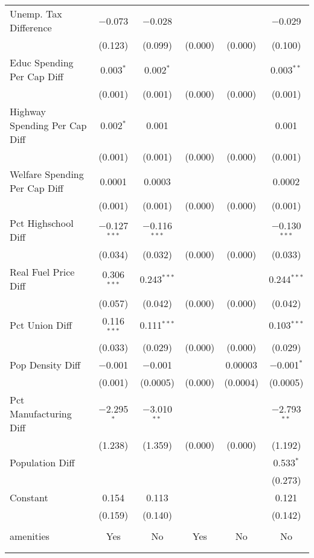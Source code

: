 \begin{table}[!htbp]
\begin{tabular}{@{\extracolsep{5pt}}lccccc}
  Unemp. Tax Difference & $-$0.073 & $-$0.028 &  &  & $-$0.029 \\ 
  & (0.123) & (0.099) & (0.000) & (0.000) & (0.100) \\ 
  Educ Spending Per Cap Diff & 0.003$^{*}$ & 0.002$^{*}$ &  &  & 0.003$^{**}$ \\ 
  & (0.001) & (0.001) & (0.000) & (0.000) & (0.001) \\ 
  Highway Spending Per Cap Diff & 0.002$^{*}$ & 0.001 &  &  & 0.001 \\ 
  & (0.001) & (0.001) & (0.000) & (0.000) & (0.001) \\ 
  Welfare Spending Per Cap Diff & 0.0001 & 0.0003 &  &  & 0.0002 \\ 
  & (0.001) & (0.001) & (0.000) & (0.000) & (0.001) \\ 
  Pct Highschool Diff & $-$0.127$^{***}$ & $-$0.116$^{***}$ &  &  & $-$0.130$^{***}$ \\ 
  & (0.034) & (0.032) & (0.000) & (0.000) & (0.033) \\ 
  Real Fuel Price Diff & 0.306$^{***}$ & 0.243$^{***}$ &  &  & 0.244$^{***}$ \\ 
  & (0.057) & (0.042) & (0.000) & (0.000) & (0.042) \\ 
  Pct Union Diff & 0.116$^{***}$ & 0.111$^{***}$ &  &  & 0.103$^{***}$ \\ 
  & (0.033) & (0.029) & (0.000) & (0.000) & (0.029) \\ 
  Pop Density Diff & $-$0.001 & $-$0.001 &  & 0.00003 & $-$0.001$^{*}$ \\ 
  & (0.001) & (0.0005) & (0.000) & (0.0004) & (0.0005) \\ 
  Pct Manufacturing Diff & $-$2.295$^{*}$ & $-$3.010$^{**}$ &  &  & $-$2.793$^{**}$ \\ 
  & (1.238) & (1.359) & (0.000) & (0.000) & (1.192) \\ 
  Population Diff &  &  &  &  & 0.533$^{*}$ \\ 
  &  &  &  &  & (0.273) \\ 
  Constant & 0.154 & 0.113 &  &  & 0.121 \\ 
  & (0.159) & (0.140) &  &  & (0.142) \\ 
 \hline \\[-1.8ex] 
amenities & Yes & No & Yes & No & No \\ 
\hline \\[-1.8ex] 
\hline 
\hline \\[-1.8ex] 
\end{tabular} 
\end{table} 
